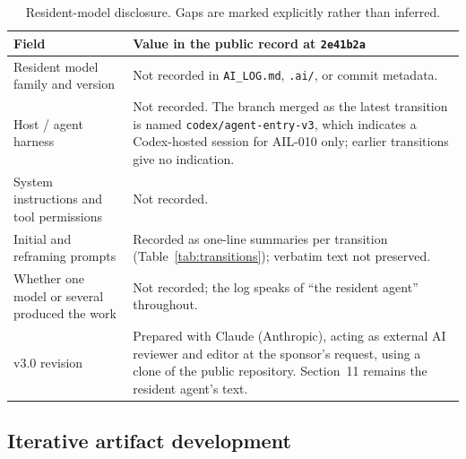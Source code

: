 \documentclass{arxiv-neurips-single}
\newcommand{\p}[1]{\nolinkurl{#1}}
\begin{document}
\begin{table}[H]
\centering\small
{}
\begin{tabularx}{\textwidth}{@{}>{\raggedright\arraybackslash}p{} Y@{}}
\toprule
\textbf{Field} & \textbf{Value in the public record at \texttt{2e41b2a}} \\
\midrule
Resident model family and version & Not recorded in \p{AI_LOG.md}, \p{.ai/}, or commit metadata. \\
Host / agent harness & Not recorded. The branch merged as the latest transition is named \p{codex/agent-entry-v3}, which indicates a Codex-hosted session for AIL-010 only; earlier transitions give no indication. \\
System instructions and tool permissions & Not recorded. \\
Initial and reframing prompts & Recorded as one-line summaries per transition (Table~\ref{tab:transitions}); verbatim text not preserved. \\
Whether one model or several produced the work & Not recorded; the log speaks of ``the resident agent'' throughout. \\
v3.0 revision & Prepared with Claude (Anthropic), acting as external AI reviewer and editor at the sponsor's request, using a clone of the public repository. Section~11 remains the resident agent's text. \\
\bottomrule
\end{tabularx}
\caption{Resident-model disclosure. Gaps are marked explicitly rather than inferred.}\label{tab:disclosure}
\end{table}

\subsection{Iterative artifact development}
\end{document}
